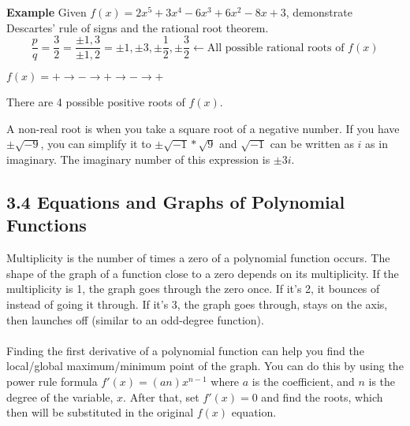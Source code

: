\documentclass[12pt]{article}
\begin{document}
\begin{tcolorbox}
	\textbf{Example} Given $f(x)=2x^5+3x^4-6x^3+6x^2-8x+3$, demonstrate Descartes' rule of signs and the rational root theorem.
	\begin{equation*}
		\frac{p}{q}=\frac{3}{2}=\frac{\pm1,3}{\pm1,2}=\pm1, \pm3, \pm\frac{1}{2}, \pm\frac{3}{2} \leftarrow \text{All possible rational roots of $f(x)$}
	\end{equation*}
	
	\begin{center}
		$f(x) = + \rightarrow - \rightarrow + \rightarrow - \rightarrow +$
	\end{center}
	There are 4 possible positive roots of $f(x)$.
\end{tcolorbox}

A non-real root is when you take a square root of a negative number. If you have $\pm\sqrt{-9}$, you can simplify it to $\pm\sqrt{-1}*\sqrt{9}$ and $\sqrt{-1}$ can be written as $i$ as in imaginary. The imaginary number of this expression is $\pm3i$.

\subsection*{3.4 Equations and Graphs of Polynomial Functions}
Multiplicity is the number of times a zero of a polynomial function occurs. The shape of the graph of a function close to a zero depends on its multiplicity. If the multiplicity is 1, the graph goes through the zero once. If it's 2, it bounces of instead of going it through. If it's 3, the graph goes through, stays on the axis, then launches off (similar to an odd-degree function). \\
\\
Finding the first derivative of a polynomial function can help you find the local/global maximum/minimum point of the graph. You can do this by using the power rule formula $f'(x)=(an)x^{n-1}$ where $a$ is the coefficient, and $n$ is the degree of the variable, $x$. After that, set $f'(x)=0$ and find the roots, which then will be substituted in the original $f(x)$ equation.
\\
\\
\end{document}
